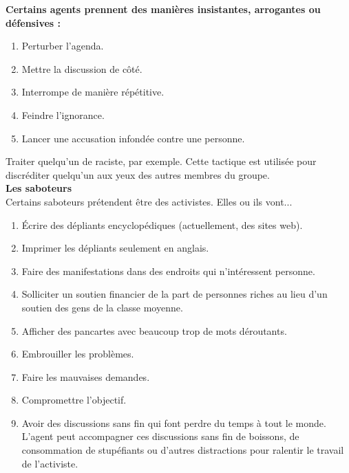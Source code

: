 \documentclass[11pt,twoside,a4paper]{article}
\begin{document}
\textbf{\large Certains agents prennent des mani{\`e}res insistantes, arrogantes ou d{\'e}fensives :}~\\
\setlength\parindent{20pt}
\begin{enumerate}
	\item Perturber l'agenda. 
	\item Mettre la discussion de c{\^o}t{\'e}. 
	\item Interrompe de mani{\`e}re r{\'e}p{\'e}titive. 
	\item Feindre l'ignorance. 
	\item Lancer une accusation infond{\'e}e contre une personne.
\end{enumerate}
\setlength\parindent{0pt}
Traiter quelqu'un de raciste, par exemple. Cette tactique est utilis{\'e}e pour discr{\'e}diter quelqu'un aux yeux des autres membres du groupe.~\\

\textbf{\large Les saboteurs}~\\
Certains saboteurs pr{\'e}tendent {\^e}tre des activistes. Elles ou ils vont...~\\
\setlength\parindent{20pt}
\begin{enumerate}
	\item {\'E}crire des d{\'e}pliants encyclop{\'e}diques (actuellement, des sites web). 
	\item Imprimer les d{\'e}pliants seulement en anglais. 
	\item Faire des manifestations dans des endroits qui n'int{\'e}ressent personne. 
	\item Solliciter un soutien financier de la part de personnes riches au lieu d'un soutien des gens de la classe moyenne. 
	\item Afficher des pancartes avec beaucoup trop de mots d{\'e}routants. 
	\item Embrouiller les probl{\`e}mes. 
	\item Faire les mauvaises demandes. 
	\item Compromettre l'objectif. 
	\item Avoir des discussions sans fin qui font perdre du temps {\`a} tout le monde. L'agent peut accompagner ces discussions sans fin de boissons, de consommation de stup{\'e}fiants ou d'autres distractions pour ralentir le travail de l'activiste. 
\end{enumerate}~\\
\setlength\parindent{0pt}

\clearpage
\end{document}
